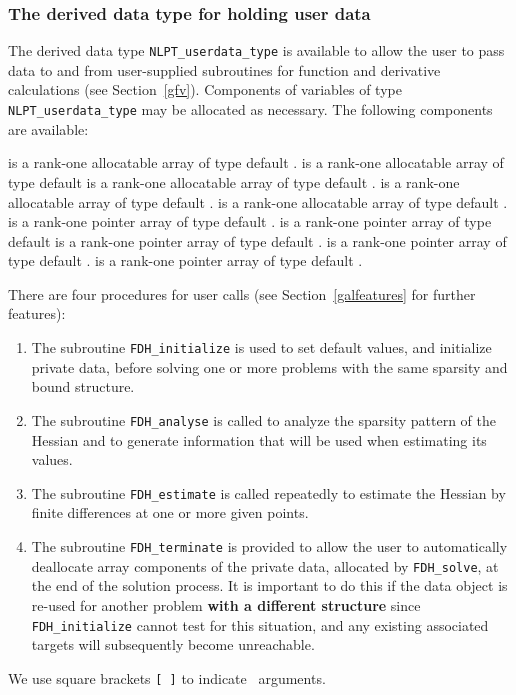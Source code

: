 \documentclass{galahad}
\newcommand{\packagename}{FDH}
\begin{document}

\subsubsection{The derived data type for holding user data}\label{typeuserdata}
The derived data type
{\tt NLPT\_userdata\_type}
is available to allow the user to pass data to and from user-supplied
subroutines for function and derivative calculations (see Section~\ref{gfv}).
Components of variables of type {\tt NLPT\_userdata\_\-type} may be allocated as
necessary. The following components are available:

\begin{description}
 is a rank-one allocatable array of type default \integer.
 is a rank-one allocatable array of type default  \realdp
{} is a rank-one allocatable array of type default \complexdp.
 is a rank-one allocatable array of type default \character.
 is a rank-one allocatable array of type default \logical.
 is a rank-one pointer array of type default \integer.
 is a rank-one pointer array of type default  \realdp
{} is a rank-one pointer array of type default \complexdp.
 is a rank-one pointer array of type default \character.
 is a rank-one pointer array of type default \logical.
\end{description}


\galarguments
There are four procedures for user calls
(see Section~\ref{galfeatures} for further features):

\begin{enumerate}
\item The subroutine
      {\tt \packagename\_initialize}
      is used to set default values, and initialize private data,
      before solving one or more problems with the
      same sparsity and bound structure.
\item The subroutine
      {\tt \packagename\_analyse}
      is called to analyze the sparsity pattern of the Hessian
      and to generate information that will be used when estimating
      its values.
\item The subroutine
      {\tt \packagename\_estimate}
      is called repeatedly to estimate the Hessian by finite differences at
      one or more given points.
\item The subroutine
      {\tt \packagename\_terminate}
      is provided to allow the user to automatically deallocate array
       components of the private data, allocated by
       {\tt \packagename\_solve},
       at the end of the solution process.
       It is important to do this if the data object is re-used for another
       problem {\bf with a different structure}
       since {\tt \packagename\_initialize} cannot test for this situation,
       and any existing associated targets will subsequently become unreachable.
\end{enumerate}
We use square brackets {\tt [ ]} to indicate \optional\ arguments.
\end{document}
